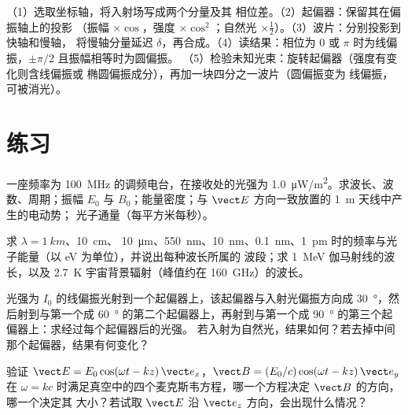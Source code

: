 \begin{method}[沿光学系统追踪偏振]\label{met:b2:plane-waves-polarization:method}
（1）选取坐标轴，将入射场写成两个分量及其
相位差。（2）起偏器：保留其在偏振轴上的投影
（振幅 $\times\cos$，强度 $\times\cos^2$；自然光
$\times\tfrac12$）。（3）波片：分别投影到快轴和慢轴，
将慢轴分量延迟 $\delta$，再合成。（4）读结果：相位为 $0$ 或 $\pi$
时为线偏振，$\pm\pi/2$ 且振幅相等时为圆偏振。
（5）检验未知光束：旋转起偏器（强度有变化则含线偏振或
椭圆偏振成分），再加一块四分之一波片（圆偏振变为
线偏振，可被消光）。
\end{method}

\section{练习}

\begin{exercise}[$\star$]\label{exo:b2:plane-waves-polarization:1}
一座频率为 \qty{100}{MHz} 的调频电台，在接收处的光强为
\qty{1.0}{\micro W/m^2}。求波长、波数、周期；振幅 $E_0$ 与
$B_0$；能量密度；与 $\vect E$ 方向一致放置的 \qty{1}{m} 天线中产生的电动势；
光子通量（每平方米每秒）。
\end{exercise}

\begin{exercise}[$\star$]\label{exo:b2:plane-waves-polarization:2}
求 $\lambda = \qty{1}{km}$、\qty{10}{cm}、
\qty{10}{\micro m}、\qty{550}{nm}、\qty{10}{nm}、\qty{0.1}{nm}、\qty{1}{pm} 时的频率与光子能量（以 eV 为单位），并说出每种波长所属的
波段；求 \qty{1}{MeV} 伽马射线的波长，以及
\qty{2.7}{K} 宇宙背景辐射（峰值约在 \qty{160}{GHz}）的波长。
\end{exercise}

\begin{exercise}[$\star$]\label{exo:b2:plane-waves-polarization:3}
光强为 $I_0$ 的线偏振光射到一个起偏器上，该起偏器与入射光偏振方向成
\qty{30}{\degree}，然后射到与第一个成 \qty{60}{\degree} 的第二个起偏器上，再射到与第一个成
\qty{90}{\degree} 的第三个起偏器上：求经过每个起偏器后的光强。
若入射为自然光，结果如何？若去掉中间那个起偏器，结果有何变化？
\end{exercise}

\begin{exercise}[$\star$]\label{exo:b2:plane-waves-polarization:4}
验证 $\vect E = E_0\cos(\omega t - kz)\,\vect e_x$，$\vect B = (E_0/c)\cos(\omega t
- kz)\,\vect e_y$ 在 $\omega =
kc$ 时满足真空中的四个麦克斯韦方程，哪一个方程决定 $\vect B$ 的方向，哪一个决定其
大小？若试取 $\vect E$ 沿 $\vect e_z$ 方向，会出现什么情况？
\end{exercise}


